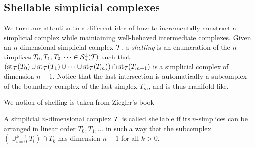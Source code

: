 \documentclass[a4paper]{amsart}
\begin{document}





\subsection{Shellable simplicial complexes}

We turn our attention to a different idea of how to incrementally construct a simplicial complex while maintaining well-behaved intermediate complexes. 
Given an $n$-dimensional simplicial complex ${\mathcal T}$, a \emph{shelling} is an enumeration of the $n$-simplices $T_{0}, T_{1}, T_{2}, \dots \in {\mathcal S}^{\downarrow}_{n}({\mathcal T})$ such that $( \operatorname{st}_{{\mathcal T}}(T_{0}) \cup \operatorname{st}_{{\mathcal T}}(T_{1}) \cup \dots \cup \operatorname{st}_{{\mathcal T}}(T_{m}) ) \cap \operatorname{st}_{{\mathcal T}}(T_{m+1})$ is a simplicial complex of dimension $n-1$. Notice that the last intersection is automatically a subcomplex of the boundary complex of the last simplex $T_{m}$, and is thus manifold like. 



We notion of shelling is taken from Ziegler's book~\cite{ziegler2012lectures}


% 

A simplicial $n$-dimensional complex ${\mathcal T}$ is called shellable if its $n$-simplices can be arranged in linear order $T_0, T_1, \dots$ in such a way that the subcomplex $( \cup_{i=0}^{k-1} T_i ) \cap T_k$ has dimension $n-1$ for all $k > 0$.
\end{document}
